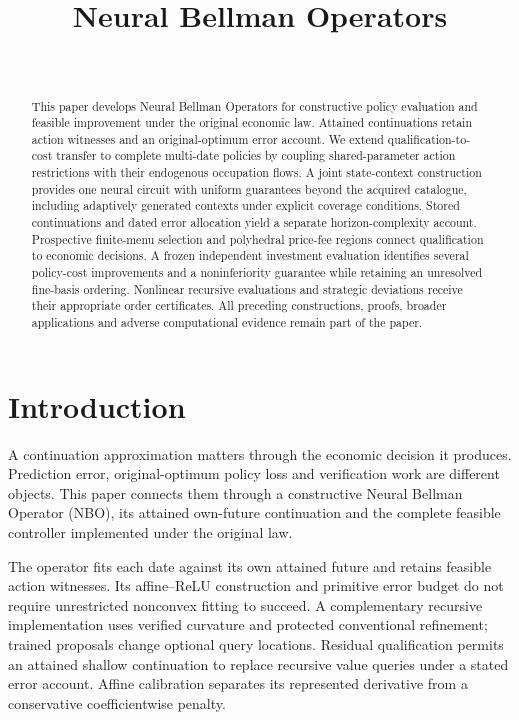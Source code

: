 \documentclass[ecta,nameyear,draft]{econsocart}
\begin{document}
\begin{frontmatter}
\title{Neural Bellman Operators}
\begin{aug}
\author[id=au1,addressref={add1}]{~}
\address[id=add1]{Peking University}
\end{aug}
\begin{abstract}
This paper develops Neural Bellman Operators for constructive policy evaluation and feasible improvement under the original economic law. Attained continuations retain action witnesses and an original-optimum error account. We extend qualification-to-cost transfer to complete multi-date policies by coupling shared-parameter action restrictions with their endogenous occupation flows. A joint state-context construction provides one neural circuit with uniform guarantees beyond the acquired catalogue, including adaptively generated contexts under explicit coverage conditions. Stored continuations and dated error allocation yield a separate horizon-complexity account. Prospective finite-menu selection and polyhedral price-fee regions connect qualification to economic decisions. A frozen independent investment evaluation identifies several policy-cost improvements and a noninferiority guarantee while retaining an unresolved fine-basis ordering. Nonlinear recursive evaluations and strategic deviations receive their appropriate order certificates. All preceding constructions, proofs, broader applications and adverse computational evidence remain part of the paper.
\end{abstract}
\begin{keyword}
\end{keyword}
\end{frontmatter}
\section{Introduction}\label{sec:introduction65}
A continuation approximation matters through the economic decision it produces. Prediction error, original-optimum policy loss and verification work are different objects. This paper connects them through a constructive Neural Bellman Operator (NBO), its attained own-future continuation and the complete feasible controller implemented under the original law.

The operator fits each date against its own attained future and retains feasible action witnesses. Its affine--ReLU construction and primitive error budget do not require unrestricted nonconvex fitting to succeed. A complementary recursive implementation uses verified curvature and protected conventional refinement; trained proposals change optional query locations. Residual qualification permits an attained shallow continuation to replace recursive value queries under a stated error account. Affine calibration separates its represented derivative from a conservative coefficientwise penalty.
\end{document}
